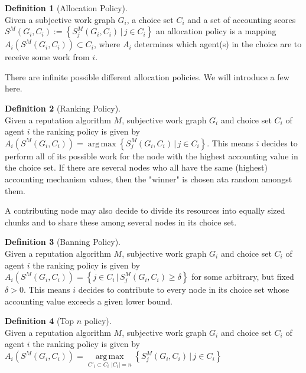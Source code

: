 \documentclass[11pt,a4paper]{report}
\theoremstyle{definition}
\newtheorem{definition}{Definition}[section]
\theoremstyle{theorem}
\theoremstyle{proposition}
\theoremstyle{corollary}
\theoremstyle{lemma}
\theoremstyle{example}
\theoremstyle{remark}
\DeclareMathOperator*{\argmax}{arg\,max}
\begin{document}
\begin{definition}[Allocation Policy]\ \\
Given a subjective work graph $G_i$, a choice set $C_i$ and a set of accounting scores $S^M(G_i,C_i):=\left\lbrace{}S^M_j(G_i,C_i)\,|\,j\in{}C_i\right\rbrace$ an allocation policy is a mapping $A_i(S^M(G_i,C_i))\subset{}C_i$, where $A_i$ determines which agent(s) in the choice are to receive some work from $i$.
\end{definition}

\noindent{}There are infinite possible different allocation policies. We will introduce a few here.

\begin{definition}[Ranking Policy]\ \\
Given a reputation algorithm $M$, subjective work graph $G_i$ and choice set $C_i$ of agent $i$ the ranking policy is given by $A_i(S^M(G_i,C_i))=\argmax{\left\lbrace{}S^M_j(G_i,C_i)\,|\,j\in{}C_i\right\rbrace}$. This means $i$ decides to perform all of its possible work for the node with the highest accounting value in the choice set. If there are several nodes who all have the same (highest) accounting mechanism values, then the "winner" is chosen ata random amongst them.
\end{definition}

\noindent{}A contributing node may also decide to divide its resources into equally sized chunks and to share these among several nodes in its choice set. 

\begin{definition}[Banning Policy]\ \\
Given a reputation algorithm $M$, subjective work graph $G_i$ and choice set $C_i$ of agent $i$ the ranking policy is given by $A_i(S^M(G_i,C_i))=\left\lbrace{}j\in{}C_i\,|\,S^M_j(G_i,C_i)\geq\delta\right\rbrace$ for some arbitrary, but fixed $\delta>0$. This means $i$ decides to contribute to every node in its choice set whose accounting value exceeds a given lower bound. 
\end{definition}

\begin{definition}[Top $n$ policy]\ \\
Given a reputation algorithm $M$, subjective work graph $G_i$ and choice set $C_i$ of agent $i$ the ranking policy is given by $A_i(S^M(G_i,C_i))=\argmax\limits_{C'_i\subset{}C_i \,\, |C_i|=n}{\left\lbrace{}S^M_j(G_i,C_i)\,|\,j\in{}C_i\right\rbrace}$
\end{definition}
\end{document}
